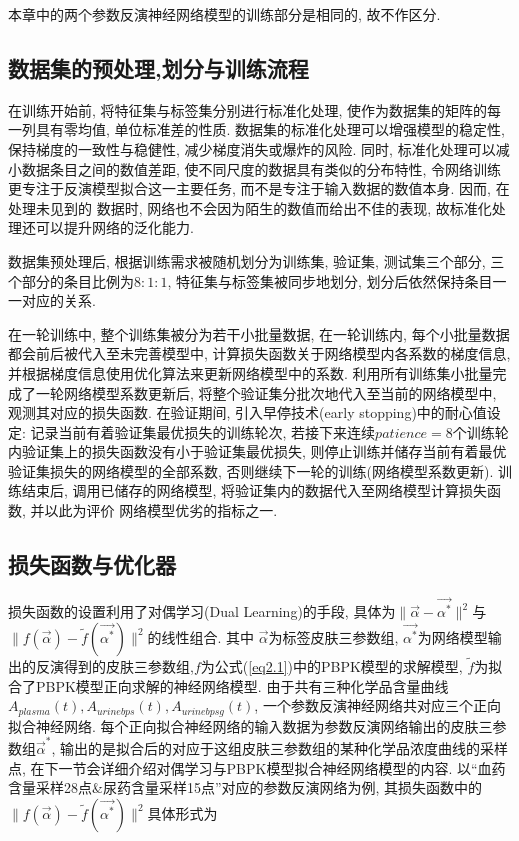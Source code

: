 \documentclass[a4paper,punct=banjiao,twoside]{ctexrep}
\theoremstyle{plain}
\theoremstyle{definition}
\theoremstyle{remark}
\begin{document}
本章中的两个参数反演神经网络模型的训练部分是相同的, 故不作区分. 
\subsection{数据集的预处理,划分与训练流程}
在训练开始前, 将特征集与标签集分别进行标准化处理, 使作为数据集的矩阵的每一列具有零均值, 单位标准差的性质. 数据集的标准化处理可以增强模型的稳定性, 保持梯度的一致性与稳健性, 减少梯度消失或爆炸的风险\cite{21}. 同时, 标准化处理可以减小数据条目之间的数值差距, 使不同尺度的数据具有类似的分布特性, 令网络训练更专注于反演模型拟合这一主要任务, 而不是专注于输入数据的数值本身. 因而, 在处理未见到的
数据时, 网络也不会因为陌生的数值而给出不佳的表现, 故标准化处理还可以提升网络的泛化能力\cite{22}.

数据集预处理后, 根据训练需求被随机划分为训练集, 验证集, 测试集三个部分, 三个部分的条目比例为$8:1:1$, 特征集与标签集被同步地划分, 划分后依然保持条目一一对应的关系. 

在一轮训练中, 整个训练集被分为若干小批量数据, 在一轮训练内, 每个小批量数据都会前后被代入至未完善模型中,
计算损失函数关于网络模型内各系数的梯度信息, 并根据梯度信息使用优化算法来更新网络模型中的系数\cite{23}. 
利用所有训练集小批量完成了一轮网络模型系数更新后, 将整个验证集分批次地代入至当前的网络模型中, 
观测其对应的损失函数\cite{23}. 在验证期间, 引入早停技术(early stopping)中的耐心值设定: 记录当前有着验证集最优损失的训练轮次, 若接下来连续$patience = 8$个训练轮内验证集上的损失函数没有小于验证集最优损失, 则停止训练并储存当前有着最优验证集损失的网络模型的全部系数, 否则继续下一轮的训练(网络模型系数更新)\cite{23}. 训练结束后, 调用已储存的网络模型, 将验证集内的数据代入至网络模型计算损失函数, 并以此为评价
网络模型优劣的指标之一.

\subsection{损失函数与优化器}

损失函数的设置利用了对偶学习(Dual Learning)的手段, 具体为$\|\vec{\alpha}-\vec{\alpha^*} \|^2$与$\|f(\vec{\alpha})-\tilde{f}(\vec{\alpha^*}) \|^2$的线性组合. 其中
$\vec{\alpha}$为标签皮肤三参数组, $\vec{\alpha^*}$为网络模型输出的反演得到的皮肤三参数组,$f$为公式(\ref{eq2.1})中的PBPK模型的求解模型, $\tilde{f}$为拟合了PBPK模型正向求解的神经网络模型. 由于共有三种化学品含量曲线$A_{plasma}(t), A_{urinebps}(t), A_{urinebpsg}(t)$, 一个参数反演神经网络共对应三个正向拟合神经网络. 每个正向拟合神经网络的输入数据为参数反演网络输出的皮肤三参数组$\vec{\alpha}^*$, 输出的是拟合后的对应于这组皮肤三参数组的某种化学品浓度曲线的采样点, 在下一节会详细介绍对偶学习与PBPK模型拟合神经网络模型的内容. 
以``血药含量采样28点\&尿药含量采样15点''对应的参数反演网络为例, 其损失函数中的$\|f(\vec{\alpha})-\tilde{f}(\vec{\alpha^*}) \|^2$具体形式为
\end{document}
